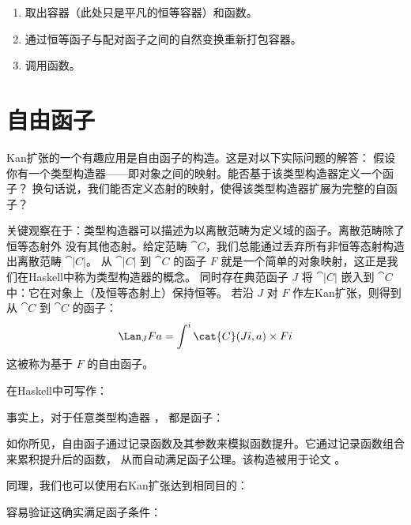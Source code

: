 \begin{enumerate}
  \tightlist
  \item
        取出容器（此处只是平凡的恒等容器）和函数。
  \item
        通过恒等函子与配对函子之间的自然变换重新打包容器。
  \item
        调用函数。
\end{enumerate}

\section{自由函子}

Kan扩张的一个有趣应用是自由函子的构造。这是对以下实际问题的解答：
假设你有一个类型构造器——即对象之间的映射。能否基于该类型构造器定义一个函子？
换句话说，我们能否定义态射的映射，使得该类型构造器扩展为完整的自函子？

关键观察在于：类型构造器可以描述为以离散范畴为定义域的函子。离散范畴除了恒等态射外
没有其他态射。给定范畴 $\cat{C}$，我们总能通过丢弃所有非恒等态射构造出离散范畴 $\cat{|C|}$。
从 $\cat{|C|}$ 到 $\cat{C}$ 的函子 $F$ 就是一个简单的对象映射，这正是我们在Haskell中称为类型构造器的概念。
同时存在典范函子 $J$ 将 $\cat{|C|}$ 嵌入到 $\cat{C}$ 中：它在对象上（及恒等态射上）保持恒等。
若沿 $J$ 对 $F$ 作左Kan扩张，则得到从 $\cat{C}$ 到 $\cat{C}$ 的函子：
$$\Lan_{J}F a = \int^i \cat{C}(J i, a)\times{}F i$$
这被称为基于 $F$ 的自由函子。

在Haskell中可写作：

事实上，对于任意类型构造器 ， 都是函子：

如你所见，自由函子通过记录函数及其参数来模拟函数提升。它通过记录函数组合来累积提升后的函数，
从而自动满足函子公理。该构造被用于论文
。

同理，我们也可以使用右Kan扩张达到相同目的：

容易验证这确实满足函子条件：


